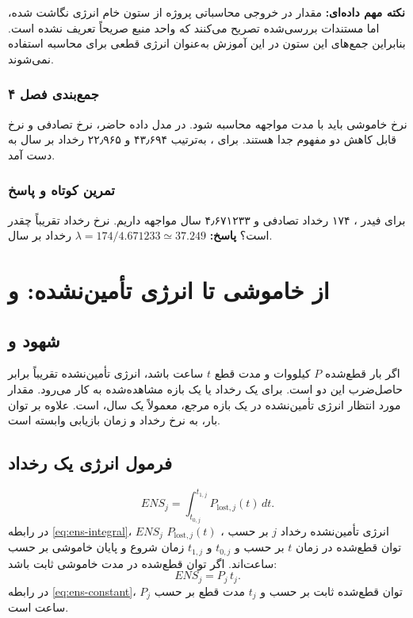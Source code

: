\documentclass[11pt,a4paper,oneside]{book}
\newcommand{\code}[1]{\lr{\texttt{#1}}}
\newcommand{\summary}[1]{\subsection*{جمع‌بندی فصل #1}}
\newcommand{\exercise}{\subsection*{تمرین کوتاه و پاسخ}}
\newcommand{\answer}{\noindent\textbf{پاسخ:} }
\newcommand{\warn}{\noindent\textbf{نکته مهم داده‌ای:} }
\begin{document}
\warn مقدار \code{energy\_kwh} در خروجی محاسباتی پروژه از ستون خام انرژی نگاشت شده، اما مستندات بررسی‌شده تصریح می‌کنند که واحد منبع صریحاً تعریف نشده است. بنابراین جمع‌های این ستون در این آموزش به‌عنوان انرژی قطعی  برای محاسبه  استفاده نمی‌شوند.

\summary{۴}
نرخ خاموشی باید با مدت مواجهه محاسبه شود. در مدل داده حاضر، نرخ تصادفی و نرخ قابل کاهش دو مفهوم جدا هستند. برای \code{F5}، به‌ترتیب ۴۳٫۶۹۴ و ۲۲٫۹۶۵ رخداد بر سال به دست آمد.

\exercise
برای فیدر \code{F6}، ۱۷۴ رخداد تصادفی و ۴٫۶۷۱۲۳۳ سال مواجهه داریم. نرخ رخداد تقریباً چقدر است؟
\answer $\lambda=174/4.671233\simeq37.249$ رخداد بر سال.

\chapter{از خاموشی تا انرژی تأمین‌نشده:  و }
\section{شهود  و }
اگر بار قطع‌شده $P$ کیلووات و مدت قطع $t$ ساعت باشد، انرژی تأمین‌نشده تقریباً برابر حاصل‌ضرب این دو است.  برای یک رخداد یا یک بازه مشاهده‌شده به کار می‌رود.  مقدار مورد انتظار انرژی تأمین‌نشده در یک بازه مرجع، معمولاً یک سال، است.  علاوه بر توان بار، به نرخ رخداد و زمان بازیابی وابسته است.

\section{فرمول انرژی یک رخداد}
\begin{equation}
 ENS_j=\int_{t_{0,j}}^{t_{1,j}}P_{\mathrm{lost},j}(t)\,dt.
 \label{eq:ens-integral}
\end{equation}
در رابطه \eqref{eq:ens-integral}، $ENS_j$ انرژی تأمین‌نشده رخداد $j$ بر حسب ، $P_{\mathrm{lost},j}(t)$ توان قطع‌شده در زمان $t$ بر حسب  و $t_{0,j}$ و $t_{1,j}$ زمان شروع و پایان خاموشی بر حسب ساعت‌اند. اگر توان قطع‌شده در مدت خاموشی ثابت باشد:
\begin{equation}
 ENS_j=P_j\,t_j.
 \label{eq:ens-constant}
\end{equation}
در رابطه \eqref{eq:ens-constant}، $P_j$ توان قطع‌شده ثابت بر حسب  و $t_j$ مدت قطع بر حسب ساعت است.
\end{document}
